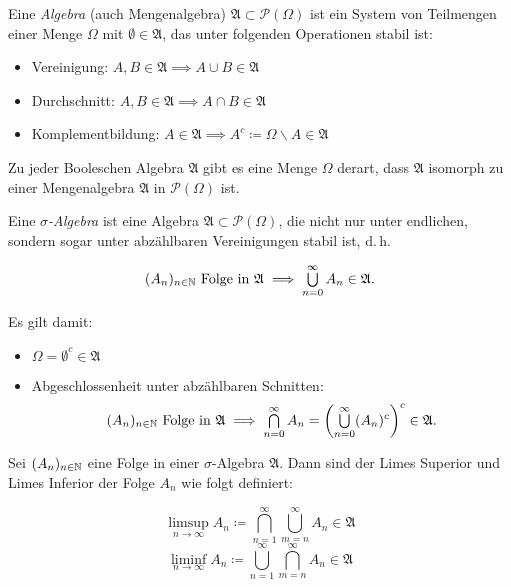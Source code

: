 \documentclass{cheat-sheet}
\begin{document}
\begin{defn}
  Eine \emph{Algebra} (auch Mengenalgebra) $\mathfrak{A} \subset \mathcal{P}(\Omega)$ ist ein System von Teilmengen einer Menge $\Omega$ mit $\emptyset \in \mathfrak{A}$, das unter folgenden Operationen stabil ist:
  \begin{itemize}
    \item Vereinigung: $A, B \in \mathfrak{A} \implies A \cup B \in \mathfrak{A}$
    \item Durchschnitt: $A, B \in \mathfrak{A} \implies A \cap B \in \mathfrak{A}$
    \item Komplementbildung: $A \in \mathfrak{A} \implies A^c \coloneqq \Omega \backslash A \in \mathfrak{A}$
  \end{itemize}
\end{defn}

\begin{satz}
Zu jeder Booleschen Algebra $\mathfrak{A}$ gibt es eine Menge $\Omega$ derart, dass $\mathfrak{A}$ isomorph zu einer Mengenalgebra $\mathfrak{A}$ in $\mathcal{P}(\Omega)$ ist.
\end{satz}

\begin{defn}
  Eine \emph{$\sigma$-Algebra} ist eine Algebra $\mathfrak{A} \subset \mathcal{P}(\Omega)$, die nicht nur unter endlichen, sondern sogar unter abzählbaren Vereinigungen stabil ist, d.\,h.

  \[ (A_n)_{n \in \N} \text{ Folge in } \mathfrak{A} \implies \bigcup_{n = 0}^{\infty} A_n \in \mathfrak{A}. \]
\end{defn}

\begin{bem}
  Es gilt damit:

  \begin{itemize}
    \item $\Omega = \emptyset^c \in \mathfrak{A}$
    \item Abgeschlossenheit unter abzählbaren Schnitten:
  \[ (A_n)_{n \in \N} \text{ Folge in } \mathfrak{A} \implies \bigcap_{n = 0}^{\infty} A_n = \left( \bigcup_{n = 0}^{\infty} (A_n)^c \right)^c \in \mathfrak{A}. \]
  \end{itemize}
\end{bem}

\begin{defn}
  Sei $(A_n)_{n \in \mathbb{N}}$ eine Folge in einer $\sigma$-Algebra $\mathfrak{A}$. Dann sind der Limes Superior und Limes Inferior der Folge $A_n$ wie folgt definiert:

  \[ \limsup_{n \to \infty} A_n \coloneqq \bigcap_{n = 1}^{\infty} \bigcup_{m = n}^{\infty} A_n \in \mathfrak{A} \]
  \[ \liminf_{n \to \infty} A_n \coloneqq \bigcup_{n = 1}^{\infty} \bigcap_{m = n}^{\infty} A_n \in \mathfrak{A} \]
\end{defn}
\end{document}
